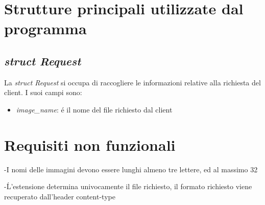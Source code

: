 \documentclass[a4paper, titlepage]{article}
\begin{document}
	\section{Strutture principali utilizzate dal programma}
	\subsection{\textit{struct Request}}
	\begin{flushleft}
		La \textit{struct Request} si occupa di raccogliere le informazioni relative alla richiesta del client. I suoi campi sono:
		\begin{itemize}
			\item \textit{image\_name}: \'{e} il nome del file richiesto dal client
		\end{itemize}
	\end{flushleft}
	
	\section{Requisiti non funzionali}
	\begin{flushleft}
		-I nomi delle immagini devono essere lunghi almeno tre lettere, ed al massimo 32

		-Ĺ'estensione determina univocamente il file richiesto, il formato richiesto viene recuperato dall'header content-type
	\end{flushleft}
	
\end{document}
